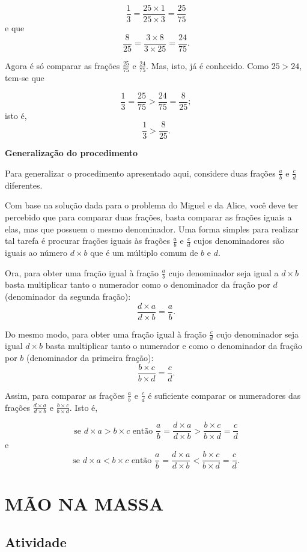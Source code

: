 $$\dfrac{1}{3} = \dfrac{25 \times 1}{25 \times 3} = \dfrac{25}{75}$$
e que 
$$\dfrac{8}{25} = \dfrac{3 \times 8}{3 \times 25} = \dfrac{24}{75}.$$ 

Agora é só comparar as frações $\frac{25}{75}$ e $\frac{24}{75}$. Mas, isto, já é conhecido.
Como $25 > 24$, tem-se que 

$$\dfrac{1}{3} = \dfrac{25}{75} > \dfrac{24}{75} =  \dfrac{8}{25};$$
isto é, 
$$\dfrac{1}{3} > \dfrac{8}{25}.$$

{\bf Generalização do procedimento}

Para generalizar o procedimento apresentado aqui, considere duas frações $\frac{a}{b}$ e $\frac{c}{d}$ diferentes.

Com base na solução dada para o problema do Miguel e da Alice, você deve ter percebido que para comparar duas frações, basta comparar as frações iguais a elas, mas que possuem o mesmo denominador. Uma forma simples para realizar tal tarefa é procurar frações iguais às frações  $\frac{a}{b}$ e $\frac{c}{d}$ cujos denominadores são iguais ao número $d\times b$ que é um múltiplo comum de $b$ e $d$.

Ora, para obter uma fração igual à fração $\frac{a}{b}$ cujo denominador seja igual a $d\times b$ basta multiplicar tanto o numerador como o denominador da fração por $d$ (denominador da segunda fração):
$$\dfrac{d\times a}{d \times b} =  \dfrac{a}{b}.$$

Do mesmo modo, para obter uma fração igual à fração $\frac{c}{d}$ cujo denominador seja igual $d\times b$ basta multiplicar tanto o numerador e como o denominador da fração por $b$ (denominador da primeira fração):
$$\dfrac{b\times c}{b \times d} =  \dfrac{c}{d}.$$

Assim, para comparar as frações $\frac{a}{b}$ e $\frac{c}{d}$ é suficiente comparar os numeradores das frações  $\frac{d\times a}{d \times b}$ e $\frac{b\times c}{b \times d}$.
Isto é, 

$$\text{se } d\times a > b\times c \text{ então }  \dfrac{a}{b} = \dfrac{d\times a}{d \times b} >\dfrac{b\times c}{b \times d} =  \dfrac{c}{d}$$
e
$$\text{se } d\times a < b\times c \text{ então }  \dfrac{a}{b} = \dfrac{d\times a}{d \times b} < \dfrac{b\times c}{b \times d} =  \dfrac{c}{d}.$$


\section{MÃO NA MASSA }

\subsection{Atividade}

